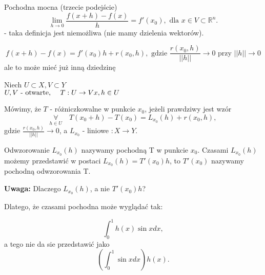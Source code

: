 \documentclass[../main.tex]{subfiles}
\begin{document}
\pagebreak
\begin{definicja}
    Pochodna mocna (trzecie podejście)
\[
 \lim\limits_{h \to 0}\frac{f(x+h) - f(x)}{h} = f'(x_0), \text{ dla }x\in V\subset \mathbb{R}^{n}
 .\]
 - taka definicja jest niemożliwa (nie mamy dzielenia wektorów).
\end{definicja}


\[
    f(x+h)-f(x)=f'(x_0) h + r(x_0,h), \text{ gdzie } \frac{r(x_0,h)}{||h||}\to 0 \text{ przy } ||h||\to 0
\]
ale to może mieć już inną dziedzinę

\begin{definicja}

    Niech $U \subset X, V\subset Y$\\
    $U,V\text{ - otwarte, }\quad T:U\to V\\
    x,h\in U$

    Mówimy, że $T$ - różniczkowalne w punkcie $x_0$, jeżeli prawdziwy jest wzór
    \[
        \underset{h\in U}{\forall} \quad T(x_0+h) - T(x_0) = L_{x_0} (h) + r(x_0,h),
    \]
    gdzie $\frac{r(x_0,h)}{||h||}\to 0$, a $L_{x_0}$ - liniowe $: X\to Y$.
\end{definicja}


\vspace{0.3cm}
Odwzorowanie $L_{x_0} (h)$ nazywamy pochodną T w punkcie $x_0$.
Czasami $L_{x_0}(h)$ możemy przedstawić w postaci $L_{x_0} (h) = T'(x_0) h$, to $T'(x_0)$ nazywamy pochodną odwzorowania T.

\vspace{0.3cm}
\textbf{Uwaga:} Dlaczego $L_{x_0}(h)$, a nie $T'(x_0) h$?
\vspace{0.3cm}

Dlatego, że czasami pochodna może wyglądać tak:

\[
    \int_0^1 h(x)\sin{x}dx
,\]
a tego nie da sie przedstawić jako
\[
    \left ( \int_0^1 \sin{x}dx \right ) h(x).
\]
\end{document}
